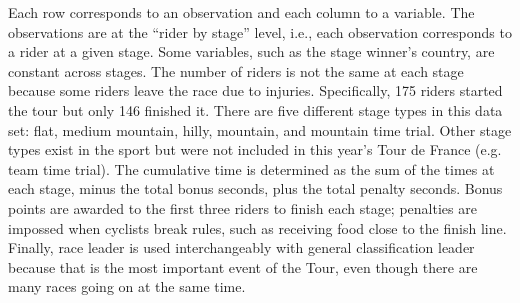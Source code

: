 \documentclass[aos,preprint]{imsart}
\begin{document}
Each row corresponds to an observation and each column to a variable. The observations are at the ``rider by stage'' level, i.e., each observation corresponds to a rider at a given stage. Some variables, such as the stage winner's country, are constant across stages. The number of riders is not the same at each stage because some riders leave the race due to injuries. Specifically, 175 riders started the tour but only 146 finished it. There are five different stage types in this data set: flat, medium mountain, hilly, mountain, and mountain time trial. Other stage types exist in the sport but were not included in this year's Tour de France (e.g. team time trial). The cumulative time is determined as the sum of the times at each stage, minus the total bonus seconds, plus the total penalty seconds. Bonus points are awarded to the first three riders to finish each stage; penalties are impossed when cyclists break rules, such as receiving food close to the finish line. Finally, race leader is used interchangeably with general classification leader because that is the most important event of the Tour, even though there are many races going on at the same time.
\end{document}
